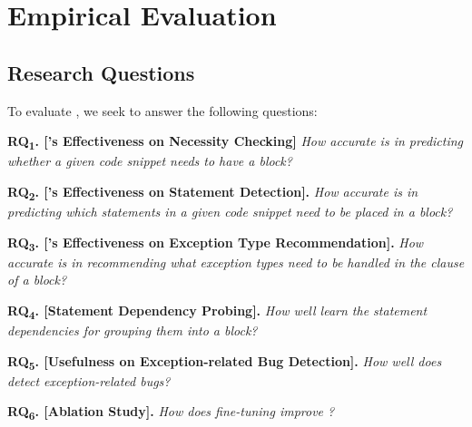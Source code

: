 \vspace{-8pt}
\section{Empirical Evaluation}
\label{sec:eval}

\subsection{Research Questions}

To evaluate {\tool}, we seek to answer the following questions:

\vspace{2pt}

\noindent \textbf{RQ\textsubscript{1}. [{\xblock}'s Effectiveness on 
    Necessity Checking]} {\em How accurate is {\tool} in predicting
  whether a given code snippet needs to have a 
  block?}
    


\vspace{2pt}
\noindent \textbf{RQ\textsubscript{2}. [{\xstate}'s Effectiveness on 
    Statement Detection].} {\em How accurate is {\tool} in predicting
  which statements in a given code snippet need to be placed in a
   block?}


\vspace{2pt}
\noindent \textbf{RQ\textsubscript{3}. [{\xtype}'s Effectiveness on Exception Type Recommendation].}
{\em How accurate is {\tool} in recommending what exception types need to be handled in the  clause of a  block?}

\vspace{2pt}
\noindent \textbf{RQ\textsubscript{4}. [Statement Dependency Probing].}
{\em How well {\tool} learn the statement dependencies for grouping them into a  block?}

\vspace{2pt}
\noindent \textbf{RQ\textsubscript{5}. [Usefulness on
    Exception-related Bug Detection].}  {\em How well does {\tool}
  detect exception-related bugs?}

\vspace{2pt}
\noindent \textbf{RQ\textsubscript{6}. [Ablation Study].} {\em How does
 fine-tuning improve {\tool}?}




